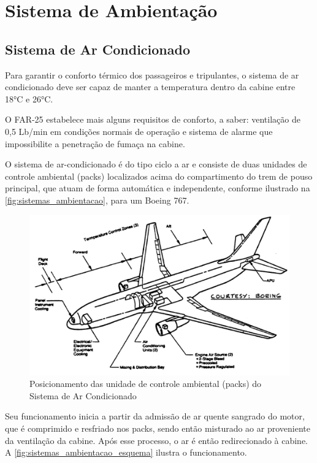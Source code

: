 \section{Sistema de Ambientação}

\subsection{Sistema de Ar Condicionado}

Para garantir o conforto térmico dos passageiros e tripulantes, o sistema de ar condicionado deve ser capaz de manter a temperatura dentro da cabine entre 18°C e 26°C.

O FAR-25 estabelece mais alguns requisitos de conforto, a saber: ventilação de 0,5 Lb/min em condições normais de operação e sistema de alarme que impossibilite a penetração de fumaça na cabine.

O sistema de ar-condicionado é do tipo ciclo a ar e consiste de duas unidades de controle ambiental (packs) localizados acima do compartimento do trem de pouso principal, que atuam de forma automática e independente, conforme ilustrado na \autoref{fig:sistemas_ambientacao}, para um Boeing 767.

\begin{figure}
\centering
\includegraphics[width=\textwidth]{images/parte3/sistemas_ambientacao.png}
\caption{Posicionamento das unidade de controle ambiental (packs) do Sistema de Ar Condicionado}
\label{fig:sistemas_ambientacao}
\end{figure}

Seu funcionamento inicia a partir da admissão de ar quente sangrado do motor, que é comprimido e resfriado nos packs, sendo então misturado ao ar proveniente da ventilação da cabine.
Após esse processo, o ar é então redirecionado à cabine.
A \autoref{fig:sistemas_ambientacao_esquema} ilustra o funcionamento.

